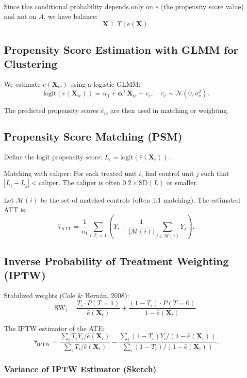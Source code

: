 \documentclass[12pt]{article}
\numberwithin{equation}{section}
\begin{document}
	Since this conditional probability depends only on $e$ (the propensity score value) and not on $A$, we have balance:
	\[
	\mathbf{X} \perp T \mid e(\mathbf{X}).
	\]
	
	\subsection{Propensity Score Estimation with GLMM for Clustering}
	
	We estimate $e(\mathbf{X}_{ic})$ using a logistic GLMM:
	\[
	\text{logit}(e(\mathbf{X}_{ic})) = \alpha_0 + \boldsymbol{\alpha}^\top \mathbf{X}_{ic} + v_c, \quad v_c \sim \mathcal{N}(0, \sigma_v^2).
	\]
	
	The predicted propensity scores $\hat{e}_{ic}$ are then used in matching or weighting.
	
	\subsection{Propensity Score Matching (PSM)}
	
	Define the logit propensity score: $L_i = \text{logit}(\hat{e}(\mathbf{X}_i))$.
	
	Matching with caliper: For each treated unit $i$, find control unit $j$ such that $|L_i - L_j| < \text{caliper}$. The caliper is often $0.2 \times \text{SD}(L)$ or smaller.
	
	Let $\mathcal{M}(i)$ be the set of matched controls (often 1:1 matching). The estimated ATT is:
	\[
	\hat{\tau}_{\text{ATT}} = \frac{1}{n_1} \sum_{i:T_i=1} \left( Y_i - \frac{1}{|\mathcal{M}(i)|} \sum_{j \in \mathcal{M}(i)} Y_j \right).
	\]
	
	\subsection{Inverse Probability of Treatment Weighting (IPTW)}
	
	Stabilized weights (Cole \& Hernán, 2008):
	\[
	\text{SW}_i = \frac{T_i \cdot P(T=1)}{\hat{e}(\mathbf{X}_i)} + \frac{(1-T_i) \cdot P(T=0)}{1 - \hat{e}(\mathbf{X}_i)}.
	\]
	
	The IPTW estimator of the ATE:
	\[
	\hat{\tau}_{\text{IPTW}} = \frac{\sum_i T_i Y_i / \hat{e}(\mathbf{X}_i)}{\sum_i T_i / \hat{e}(\mathbf{X}_i)} - \frac{\sum_i (1-T_i) Y_i / (1-\hat{e}(\mathbf{X}_i))}{\sum_i (1-T_i) / (1-\hat{e}(\mathbf{X}_i))}.
	\]
	
	\subsubsection{Variance of IPTW Estimator (Sketch)}
	
\end{document}
